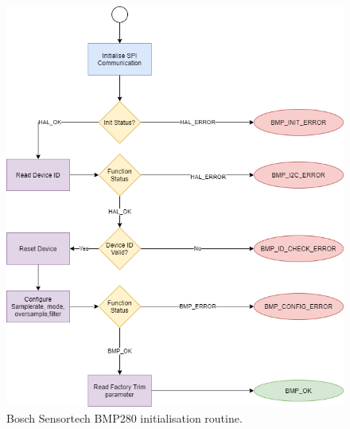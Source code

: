 \begin{figure}[H]
	\centering
	\includegraphics[scale=0.3]{Environmental Sensor Init Routine.png}
	\caption{Bosch Sensortech BMP280 initialisation routine.}
	\label{fig:Init_diagram_bmp}
\end{figure}

